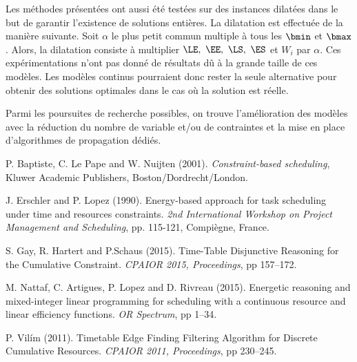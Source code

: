 Les méthodes présentées ont aussi été testées sur des instances
dilatées dans le but de garantir l'existence de solutions entières.  
La dilatation est effectuée de la manière suivante. Soit $\alpha$ le
plus petit commun 
multiple à tous les $\bmin$ et $\bmax$. Alors, la dilatation
consiste à multiplier $\LE,\ \EE,\
\LS,\ \ES$ et $W_i$ par $\alpha$. Ces
expérimentations n'ont pas donné de résultats dû à la grande taille
de ces modèles. Les modèles continus pourraient donc rester  la
seule alternative pour obtenir des solutions optimales dans le cas où
la solution est réelle.

Parmi les poursuites de recherche possibles, on trouve l'amélioration
des modèles avec la réduction du nombre de variable et/ou de contraintes et la
mise en place d'algorithmes de propagation dédiés.

\begin{thebibliography}{99}  
 P. Baptiste, C. Le Pape and W. Nuijten (2001).
\emph{Constraint-based scheduling}, Kluwer Academic Publishers,
Boston/Dordrecht/London.
  
 J. Erschler and P. Lopez (1990).  Energy-based
approach for task scheduling under time and resources constraints.
\emph{2nd International Workshop on Project Management and
Scheduling}, pp. 115-121, Compi{\`e}gne, France.
  
S. Gay, R. Hartert and P.Schaus (2015).
Time-Table Disjunctive Reasoning for the Cumulative Constraint.
\emph{CPAIOR 2015, Proceedings}, pp 157--172.

 M. Nattaf, C. Artigues, P. Lopez and D. Rivreau
(2015).  Energetic reasoning and mixed-integer linear programming for
scheduling with a continuous resource and linear efficiency functions.
\emph{OR Spectrum}, pp 1--34.

P. Vil{\'i}m (2011).
Timetable Edge Finding Filtering Algorithm for Discrete Cumulative Resources.
\emph{CPAIOR 2011, Proceedings}, pp 230--245.


\end{thebibliography}












